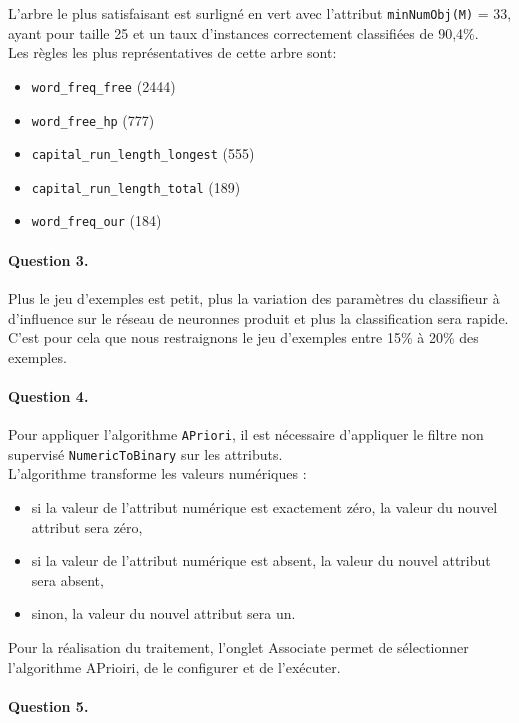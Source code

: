 \documentclass[a4paper,11pt]{article}
\begin{document}
L'arbre le plus \og{}satisfaisant\fg{} est surligné en vert avec l'attribut \texttt{minNumObj(M)} = 33, ayant pour taille 25 et un taux d'instances correctement classifiées de 90,4\%.\\

Les règles les plus représentatives de cette arbre sont:
\begin{itemize}
  \item \texttt{word\_freq\_free} (2444)
  \item \texttt{word\_free\_hp} (777)
  \item \texttt{capital\_run\_length\_longest} (555)
  \item \texttt{capital\_run\_length\_total} (189)
  \item \texttt{word\_freq\_our} (184)
\end{itemize}

\paragraph{Question 3.}
Plus le jeu d'exemples est petit, plus la variation des paramètres du classifieur à d'influence sur le réseau de neuronnes produit et plus la classification sera rapide. C'est pour cela que nous restraignons le jeu d'exemples entre 15\% à 20\% des exemples.\\




\paragraph{Question 4.}
    Pour appliquer l'algorithme \texttt{APriori}, il est nécessaire d'appliquer le filtre non supervisé \texttt{NumericToBinary} sur les attributs. \\
    
    L’algorithme transforme les valeurs numériques : 
    \begin{itemize}
	\item si la valeur de l'attribut numérique est exactement zéro, la valeur du nouvel attribut sera zéro,
	\item si la valeur de l'attribut numérique est absent, la valeur du nouvel attribut sera absent,
	\item sinon, la valeur du nouvel attribut sera un.\\
	\end{itemize}
	
    Pour la réalisation du traitement, l'onglet \og{}Associate\fg{} permet de sélectionner  l'algorithme APrioiri, de le configurer et de l'exécuter.

\paragraph{Question 5.}
	


				
		
\end{document}
